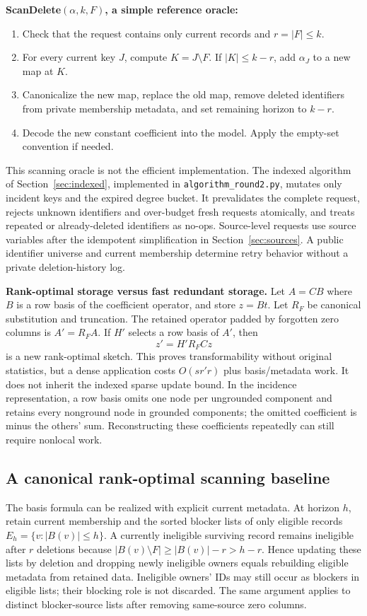 \documentclass[11pt,a4paper]{article}
\theoremstyle{definition}\newtheorem{definition}[theorem]{Definition}
\newcommand{\minus}{\setminus}
\begin{document}
\textbf{ScanDelete$(\alpha,k,F)$, a simple reference oracle:}
\begin{enumerate}
\item Check that the request contains only current records and $r=|F|\le k$.
\item For every current key $J$, compute $K=J\minus F$. If $|K|\le k-r$, add $\alpha_J$ to a new map at $K$.
\item Canonicalize the new map, replace the old map, remove deleted identifiers from private membership metadata, and set remaining horizon to $k-r$.
\item Decode the new constant coefficient into the model. Apply the empty-set convention if needed.
\end{enumerate}
This scanning oracle is not the efficient implementation. The indexed algorithm of Section~\ref{sec:indexed}, implemented in \texttt{algorithm\_round2.py}, mutates only incident keys and the expired degree bucket. It prevalidates the complete request, rejects unknown identifiers and over-budget fresh requests atomically, and treats repeated or already-deleted identifiers as no-ops. Source-level requests use source variables after the idempotent simplification in Section~\ref{sec:sources}. A public identifier universe and current membership determine retry behavior without a private deletion-history log.

\textbf{Rank-optimal storage versus fast redundant storage.} Let $A=CB$ where $B$ is a row basis of the coefficient operator, and store $z=Bt$. Let $R_F$ be canonical substitution and truncation. The retained operator padded by forgotten zero columns is $A'=R_FA$. If $H'$ selects a row basis of $A'$, then
\[
 z'=H'R_FCz
\]
is a new rank-optimal sketch. This proves transformability without original statistics, but a dense application costs $O(sr'r)$ plus basis/metadata work. It does not inherit the indexed sparse update bound. In the incidence representation, a row basis omits one node per ungrounded component and retains every nonground node in grounded components; the omitted coefficient is minus the others' sum. Reconstructing these coefficients repeatedly can still require nonlocal work.

\subsection{A canonical rank-optimal scanning baseline}
The basis formula can be realized with explicit current metadata. At horizon $h$, retain current membership and the sorted blocker lists of only eligible records $E_h=\{v:|B(v)|\le h\}$. A currently ineligible surviving record remains ineligible after $r$ deletions because $|B(v)\minus F|\ge|B(v)|-r>h-r$. Hence updating these lists by deletion and dropping newly ineligible owners equals rebuilding eligible metadata from retained data. Ineligible owners' IDs may still occur as blockers in eligible lists; their blocking role is not discarded. The same argument applies to distinct blocker-source lists after removing same-source zero columns.
\end{document}
